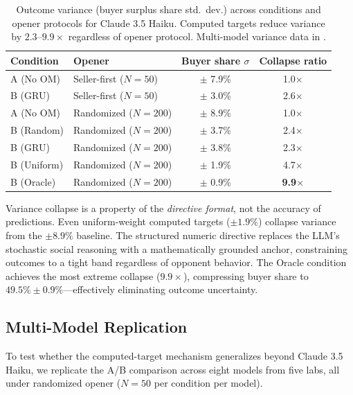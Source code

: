 \documentclass[11pt,a4paper]{article}
\begin{document}
\begin{table}[t]
\centering
\caption{Outcome variance (buyer surplus share std.\ dev.) across conditions and opener protocols for Claude 3.5 Haiku. Computed targets reduce variance by $2.3$--$9.9\times$ regardless of opener protocol. Multi-model variance data in .}
\label{tab:variance}
\begin{tabular}{llcc}
\toprule
Condition & Opener & Buyer share $\sigma$ & Collapse ratio \\
\midrule
A (No OM) & Seller-first ($N\!=\!50$) & $\pm$ 7.9\% & 1.0$\times$ \\
B (GRU) & Seller-first ($N\!=\!50$) & $\pm$ 3.0\% & 2.6$\times$ \\
\midrule
A (No OM) & Randomized ($N\!=\!200$) & $\pm$ 8.9\% & 1.0$\times$ \\
B (Random) & Randomized ($N\!=\!200$) & $\pm$ 3.7\% & 2.4$\times$ \\
B (GRU) & Randomized ($N\!=\!200$) & $\pm$ 3.8\% & 2.3$\times$ \\
B (Uniform) & Randomized ($N\!=\!200$) & $\pm$ 1.9\% & 4.7$\times$ \\
B (Oracle) & Randomized ($N\!=\!200$) & $\pm$ 0.9\% & \textbf{9.9$\times$} \\
\bottomrule
\end{tabular}
\end{table}

Variance collapse is a property of the \emph{directive format}, not the accuracy of predictions. Even uniform-weight computed targets ($\pm 1.9\%$) collapse variance from the $\pm 8.9\%$ baseline. The structured numeric directive replaces the LLM's stochastic social reasoning with a mathematically grounded anchor, constraining outcomes to a tight band regardless of opponent behavior. The Oracle condition achieves the most extreme collapse ($9.9\times$), compressing buyer share to $49.5\% \pm 0.9\%$---effectively eliminating outcome uncertainty.

\subsection{Multi-Model Replication}
\label{sec:multimodel}

To test whether the computed-target mechanism generalizes beyond Claude 3.5 Haiku, we replicate the A/B comparison across eight models from five labs, all under randomized opener ($N = 50$ per condition per model).
\end{document}
